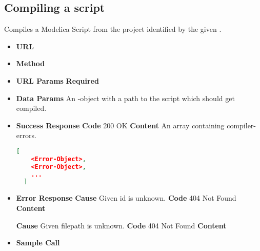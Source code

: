 \subsection{Compiling a script}
Compiles a Modelica Script from the project identified by the given .

\begin{itemize}
\item \textbf{URL} 
\item \textbf{Method} 

\item \textbf{URL Params}
  \newline\textbf{Required} 

\item \textbf{Data Params} An -object with a path to the script which
  should get compiled.

\item \textbf{Success Response}
  \newline\textbf{Code} 200 OK
  \newline\textbf{Content} An array containing compiler-errors.
  \begin{lstlisting}[basicstyle=\small,language=json]
  [
    <Error-Object>,
    <Error-Object>,
    ...
  ]
  \end{lstlisting}
  
\item \textbf{Error Response}
  \newline\textbf{Cause} Given id is unknown.
  \newline\textbf{Code} 404 Not Found
  \newline\textbf{Content} 

  \fixedspace\textbf{Cause} Given filepath is unknown.
  \newline\textbf{Code} 404 Not Found
  \newline\textbf{Content} 
\item \textbf{Sample Call}
\end{itemize}
